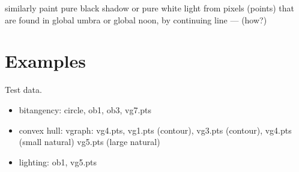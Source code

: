 \documentclass[9pt]{article}
\newif\ifJournal
\begin{document}
similarly paint pure black shadow or pure white light
     from pixels (points) that are found in global umbra
     or global noon, by continuing line --- (how?)


\section{Examples}

Test data.
\begin{itemize}
\item bitangency: circle, ob1, ob3, vg7.pts
\item convex hull: vgraph: vg4.pts, vg1.pts (contour), vg3.pts (contour), vg4.pts (small natural)
	vg5.pts (large natural)
\item lighting: ob1, vg5.pts
\end{itemize}

\fi	%
			
\end{document}
